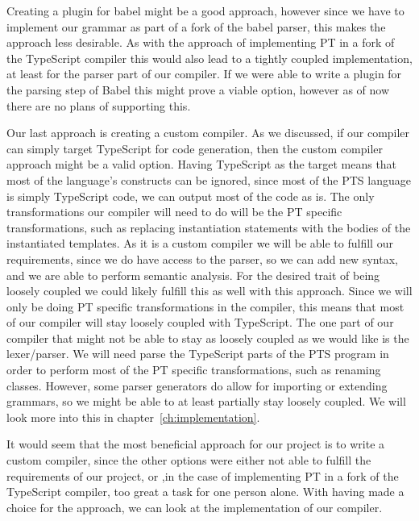 Creating a plugin for babel might be a good approach, however since we have to implement our grammar as part of a fork of the babel parser, this makes the approach less desirable.
As with the approach of implementing PT in a fork of the TypeScript compiler this would also lead to a tightly coupled implementation, at least for the parser part of our compiler.
If we were able to write a plugin for the parsing step of Babel this might prove a viable option, however as of now there are no plans of supporting this.

Our last approach is creating a custom compiler.
As we discussed, if our compiler can simply target TypeScript for code generation, then the custom compiler approach might be a valid option.
Having TypeScript as the target means that most of the language's constructs can be ignored, since most of the PTS language is simply TypeScript code, we can output most of the code as is.
The only transformations our compiler will need to do will be the PT specific transformations, such as replacing instantiation statements with the bodies of the instantiated templates.
As it is a custom compiler we will be able to fulfill our requirements, since we do have access to the parser, so we can add new syntax, and we are able to perform semantic analysis.
For the desired trait of being loosely coupled we could likely fulfill this as well with this approach.
Since we will only be doing PT specific transformations in the compiler, this means that most of our compiler will stay loosely coupled with TypeScript.
The one part of our compiler that might not be able to stay as loosely coupled as we would like is the lexer/parser.
We will need parse the TypeScript parts of the PTS program in order to perform most of the PT specific transformations, such as renaming classes.
However, some parser generators do allow for importing or extending grammars, so we might be able to at least partially stay loosely coupled.
We will look more into this in chapter~\vref{ch:implementation}.

It would seem that the most beneficial approach for our project is to write a custom compiler, since the other options were either not able to fulfill the requirements of our project, or ,in the case of implementing PT in a fork of the TypeScript compiler, too great a task for one person alone.
With having made a choice for the approach, we can look at the implementation of our compiler.